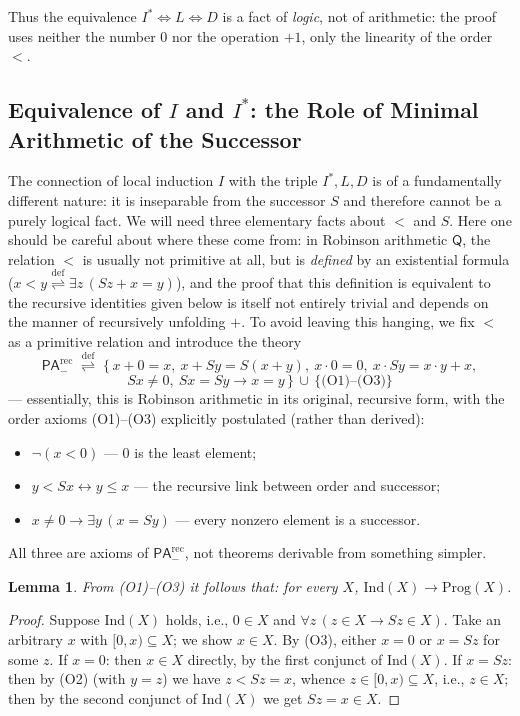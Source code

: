 \documentclass[12pt,a4paper]{article}
\theoremstyle{plain}
\newtheorem{lemma}[theorem]{Lemma}
\theoremstyle{definition}
\newcommand{\toinf}{\rightarrow}
\newcommand{\PA}{\textsf{PA}}
\newcommand{\PArec}{\PA^{\mathrm{rec}}_{-}}
\newcommand{\eqdef}{\mathrel{\overset{\mathrm{def}}{\rightleftharpoons}}}
\begin{document}
Thus the equivalence $I^*\iff L\iff D$ is a fact of \emph{logic}, not of arithmetic: the proof uses neither the number $0$ nor the operation $+1$, only the linearity of the order $<$.

\subsection{Equivalence of $I$ and $I^*$: the Role of Minimal Arithmetic of the Successor}
The connection of local induction $I$ with the triple $I^*, L, D$ is of a fundamentally different nature: it is inseparable from the successor $S$ and therefore cannot be a purely logical fact. We will need three elementary facts about $<$ and $S$. Here one should be careful about where these come from: in Robinson arithmetic $\mathsf{Q}$, the relation $<$ is usually not primitive at all, but is \emph{defined} by an existential formula ($x<y \eqdef \exists z\,(Sz+x=y)$), and the proof that this definition is equivalent to the recursive identities given below is itself not entirely trivial and depends on the manner of recursively unfolding $+$. To avoid leaving this hanging, we fix $<$ as a primitive relation and introduce the theory
$$\PArec \;\eqdef\; \big\{\,x+0=x,\ x+Sy=S(x+y),\ x\cdot0=0,\ x\cdot Sy=x\cdot y+x,$$
$$Sx\ne0,\ Sx=Sy\to x=y\,\big\} \,\cup\, \{\text{(O1)--(O3)}\}$$
--- essentially, this is Robinson arithmetic in its original, recursive form, with the order axioms (O1)--(O3) explicitly postulated (rather than derived):
\begin{itemize}
    \item[(O1)] $\neg(x<0)$ --- $0$ is the least element;
    \item[(O2)] $y<Sx \leftrightarrow y\leqslant x$ --- the recursive link between order and successor;
    \item[(O3)] $x\ne0 \toinf \exists y\,(x=Sy)$ --- every nonzero element is a successor.
\end{itemize}
All three are axioms of $\PArec$, not theorems derivable from something simpler.

\begin{lemma}
From (O1)--(O3) it follows that: for every $X$, $\mathrm{Ind}(X)\toinf\mathrm{Prog}(X)$.
\end{lemma}
\begin{proof}
Suppose $\mathrm{Ind}(X)$ holds, i.e., $0\in X$ and $\forall z\,(z\in X\toinf Sz\in X)$. Take an arbitrary $x$ with $[0,x)\subseteq X$; we show $x\in X$. By (O3), either $x=0$ or $x=Sz$ for some $z$.
If $x=0$: then $x\in X$ directly, by the first conjunct of $\mathrm{Ind}(X)$.
If $x=Sz$: then by (O2) (with $y=z$) we have $z<Sz=x$, whence $z\in[0,x)\subseteq X$, i.e., $z\in X$; then by the second conjunct of $\mathrm{Ind}(X)$ we get $Sz=x\in X$.
\end{proof}
\end{document}

